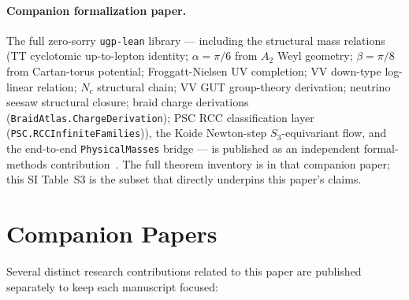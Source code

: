 \documentclass[10pt]{article}
\begin{document}
\paragraph{Companion formalization paper.}
The full zero-sorry \texttt{ugp-lean} library --- including the structural mass relations (TT cyclotomic up-to-lepton identity; $\alpha = \pi/6$ from $A_2$ Weyl geometry; $\beta = \pi/8$ from Cartan-torus potential; Froggatt-Nielsen UV completion; VV down-type log-linear relation; $N_c$ structural chain; VV GUT group-theory derivation; neutrino seesaw structural closure; braid charge derivations (\texttt{BraidAtlas.ChargeDerivation}); PSC RCC classification layer (\texttt{PSC.RCCInfiniteFamilies})), the Koide Newton-step $S_3$-equivariant flow, and the end-to-end \texttt{PhysicalMasses} bridge --- is published as an independent formal-methods contribution~\cite{SpivackUGPFormalization}.  The full theorem inventory is in that companion paper; this SI Table~S3 is the subset that directly underpins this paper's claims.

\section*{Companion Papers}
\label{sec:companion}

Several distinct research contributions related to this paper are published separately to keep each manuscript focused:
\end{document}
